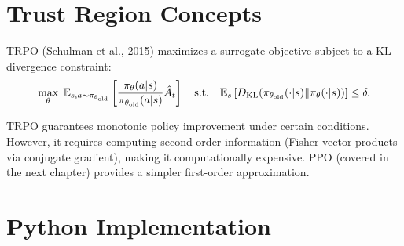 \section{Trust Region Concepts}
\label{sec:trpo_concepts}

\begin{definition}
TRPO (Schulman et al., 2015) maximizes a surrogate objective subject to
a KL-divergence constraint:
\[
    \max_\theta \; \mathbb{E}_{s,a \sim \pi_{\theta_{\text{old}}}}\left[
    \frac{\pi_\theta(a|s)}{\pi_{\theta_{\text{old}}}(a|s)} \hat{A}_t
    \right]
    \quad \text{s.t.} \quad
    \mathbb{E}_s\left[D_{\text{KL}}(\pi_{\theta_{\text{old}}}(\cdot|s)
    \| \pi_\theta(\cdot|s))\right] \leq \delta.
\]
\end{definition}

\begin{remark}
TRPO guarantees monotonic policy improvement under certain conditions.
However, it requires computing second-order information (Fisher-vector
products via conjugate gradient), making it computationally expensive.
PPO (covered in the next chapter) provides a simpler first-order
approximation.
\end{remark}

\section{Python Implementation}
\label{sec:pg:code}


